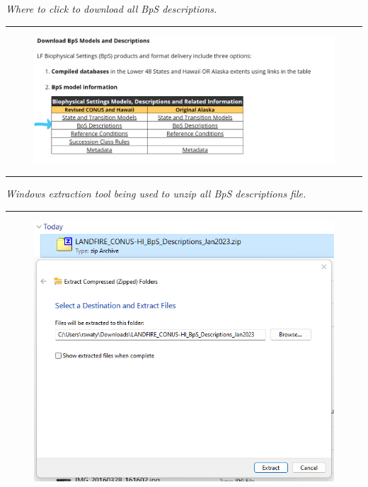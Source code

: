 \documentclass[
  letterpaper,
  DIV=11,
  numbers=noendperiod]{scrreprt}
\begin{document}
\emph{Where to click to download all BpS descriptions.}

\begin{center}\rule{0.5\linewidth}{0.5pt}\end{center}

\begin{figure}

{\centering 

\href{https://landfire.gov/bps-models.php}{\includegraphics{images/bps_descriptions/download_descriptions_all.png}}

}

\end{figure}

\begin{center}\rule{0.5\linewidth}{0.5pt}\end{center}

\emph{Windows extraction tool being used to unzip all BpS descriptions
file.}

\begin{center}\rule{0.5\linewidth}{0.5pt}\end{center}

\begin{figure}

{\centering 

\href{https://landfire.gov/bps-models.php}{\includegraphics{images/bps_descriptions/zip_click.png}}

}

\end{figure}
\end{document}
